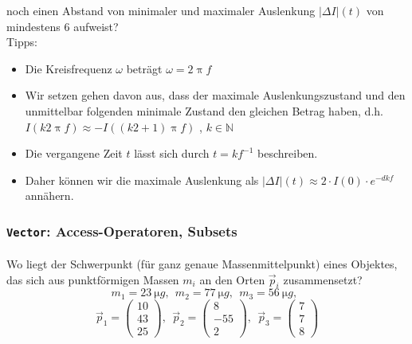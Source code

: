 \documentclass[paper=A4, pagesize, DIV=calc, smallheadings,
fontsize=12pt, expansion=false]{scrreprt}
\begin{document}
noch einen Abstand von minimaler und maximaler Auslenkung $|\Delta I|(t)$ von mindestens \SI{6}{} aufweist?\\
Tipps: 
\begin{itemize}
  \item Die Kreisfrequenz $\omega$ beträgt $\omega = 2 \uppi f$
  \item Wir setzen gehen davon aus, dass der maximale Auslenkungszustand und den unmittelbar folgenden minimale Zustand 
  den gleichen Betrag haben, d.h. $I(k2\uppi f) \approx -I\left( \left(k2 + 1 \right) \uppi f\right)$ , $k \in 
  \mathbb{N}$
  \item Die vergangene Zeit $t$ lässt sich durch $t = k f^{-1}$ beschreiben.
  \item Daher können wir die maximale Auslenkung als $|\Delta I|(t) \approx 2 \cdot I(0) \cdot  e^{-dkf} $ 
  annähern.
\end{itemize}



\subsubsection*{\texttt{\textbf{Vector}}: Access-Operatoren, Subsets}

\paragraph{}
Wo liegt der Schwerpunkt (für ganz genaue \glqq Massenmittelpunkt\grqq) eines Objektes, das sich aus punktförmigen 
Massen $m_i$ an 
den Orten $\vec{p}_i$ zusammensetzt?
\[
m_1 = \SI{23}{\micro g},~~ 
m_2 = \SI{77}{\micro g},~~
m_3 = \SI{56}{\micro g},~~
 \]
 \[
\vec{p}_1 = \begin{pmatrix}10 \\ 43 \\ 25\end{pmatrix},~~ 
\vec{p}_2 = \begin{pmatrix}8 \\ -55 \\ 2\end{pmatrix},~~ 
\vec{p}_3 = \begin{pmatrix}7 \\ 7 \\ 8\end{pmatrix}
\]
\end{document}

